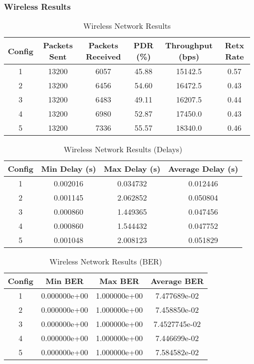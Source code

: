 \documentclass{rapport}
\begin{document}
\subsubsection{Wireless Results}
\begin{table}[H]
\centering
\caption{Wireless Network Results}
\begin{tabular}{|c|c|c|c|c|c|}
\hline
Config & Packets Sent & Packets Received & PDR (\%) & Throughput (bps) & Retx Rate\\
\hline
1 & 13200 & 6057 & 45.88 & 15142.5 & 0.57 \\
2 & 13200 & 6456 & 54.60 & 16472.5 & 0.43 \\
3 & 13200 & 6483 & 49.11 & 16207.5 & 0.44 \\
4 & 13200 & 6980 & 52.87 & 17450.0 & 0.43 \\
5 & 13200 & 7336 & 55.57 & 18340.0 & 0.46  \\
\hline
\end{tabular}
\end{table}

\begin{table}[H]
\centering
\caption{Wireless Network Results (Delays)}
\begin{tabular}{|c|c|c|c|}
\hline
Config & Min Delay (s) & Max Delay (s)  & Average Delay (s) \\
\hline
1 & 0.002016 & 0.034732 & 0.012446 \\
2 & 0.001145  & 2.062852 & 0.050804 \\
3 & 0.000860 & 1.449365 & 0.047456 \\
4 & 0.000860 & 1.544432  & 0.047752 \\
5 & 0.001048  & 2.008123  & 0.051829 \\
\hline
\end{tabular}
\end{table}

\begin{table}[H]
\centering
\caption{Wireless Network Results (BER)}
\begin{tabular}{|c|c|c|c|}
\hline
Config & Min BER & Max BER & Average BER  \\
\hline
1 & 0.000000e+00 & 1.000000e+00 & 7.477689e-02 \\
2 & 0.000000e+00  & 1.000000e+00 & 7.458850e-02 \\
3 & 0.000000e+00 & 1.000000e+00 & 7.4527745e-02 \\
4 & 0.000000e+00 & 1.000000e+00  & 7.446699e-02 \\
5 & 0.000000e+00  & 1.000000e+00 & 7.584582e-02 \\
\hline
\end{tabular}
\end{table}
\end{document}
